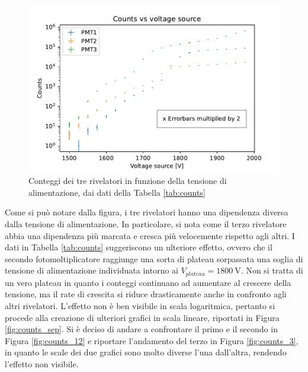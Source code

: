 \documentclass[10pt,a4paper]{article}
\begin{document}
\begin{figure}[h]
    \centering
    \includegraphics[width=\columnwidth]{img/counts123_new.pdf}
    \caption{Conteggi dei tre rivelatori in funzione della tensione di alimentazione, dai dati della Tabella \ref{tab:counts}}
    \label{fig:counts}
\end{figure}

Come si può notare dalla figura, i tre rivelatori hanno una dipendenza diversa dalla tensione di alimentazione. In particolare, si nota come il terzo rivelatore abbia una dipendenza più marcata e cresca più velocemente rispetto agli altri. I dati in Tabella \ref{tab:counts} suggeriscono un ulteriore effetto, ovvero che il secondo fotomoltiplicatore raggiunge una sorta di plateau sorpassata una soglia di tensione di alimentazione individuata intorno ai $V_{plateau}=\SI{1800}{\volt}$. Non si tratta di un vero plateau in quanto i conteggi continuano ad aumentare al crescere della tensione, ma il rate di crescita si riduce drasticamente anche in confronto agli altri rivelatori. L'effetto non è ben visibile in scala logaritmica, pertanto si procede alla creazione di ulteriori grafici in scala lineare, riportati in Figura \ref{fig:counts_sep}. Si è deciso di andare a confrontare il primo e il secondo in Figura \ref{fig:counts_12} e riportare l'andamento del terzo in Figura \ref{fig:counts_3}, in quanto le scale dei due grafici sono molto diverse l'una dall'altra, rendendo l'effetto non visibile.
\end{document}
